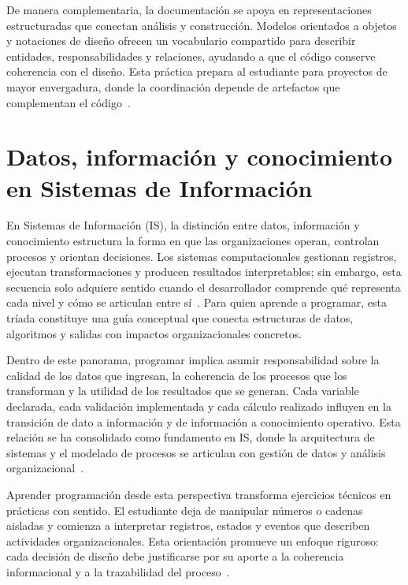 \documentclass[12pt,twoside]{book}
\begin{document}
						De manera complementaria, la documentación se apoya en representaciones estructuradas que conectan análisis y construcción. Modelos orientados a objetos y notaciones de diseño ofrecen un vocabulario compartido para describir entidades, responsabilidades y relaciones, ayudando a que el código conserve coherencia con el diseño. Esta práctica prepara al estudiante para proyectos de mayor envergadura, donde la coordinación depende de artefactos que complementan el código~\cite{Booch2007Object,Tegarden2025Systems,Ghezzi2003Fundamentals}.
						
			\section{Datos, información y conocimiento en Sistemas de Información}
				\noindent
				En Sistemas de Información (IS), la distinción entre datos, información y conocimiento estructura la forma en que las organizaciones operan, controlan procesos y orientan decisiones. Los sistemas computacionales gestionan registros, ejecutan transformaciones y producen resultados interpretables; sin embargo, esta secuencia solo adquiere sentido cuando el desarrollador comprende qué representa cada nivel y cómo se articulan entre sí~\cite{Laudon2020Management,Bernstein2009Data,Tegarden2025Systems}. Para quien aprende a programar, esta tríada constituye una guía conceptual que conecta estructuras de datos, algoritmos y salidas con impactos organizacionales concretos.
				
				Dentro de este panorama, programar implica asumir responsabilidad sobre la calidad de los datos que ingresan, la coherencia de los procesos que los transforman y la utilidad de los resultados que se generan. Cada variable declarada, cada validación implementada y cada cálculo realizado influyen en la transición de dato a información y de información a conocimiento operativo. Esta relación se ha consolidado como fundamento en IS, donde la arquitectura de sistemas y el modelado de procesos se articulan con gestión de datos y análisis organizacional~\cite{Kendall2014Systems,Laudon2020Management,Date2019Database}.
				
				Aprender programación desde esta perspectiva transforma ejercicios técnicos en prácticas con sentido. El estudiante deja de manipular números o cadenas aisladas y comienza a interpretar registros, estados y eventos que describen actividades organizacionales. Esta orientación promueve un enfoque riguroso: cada decisión de diseño debe justificarse por su aporte a la coherencia informacional y a la trazabilidad del proceso~\cite{Hanly2015Problem,Gaddis2022Starting,Wirth1976Algorithms}.
				
\end{document}
